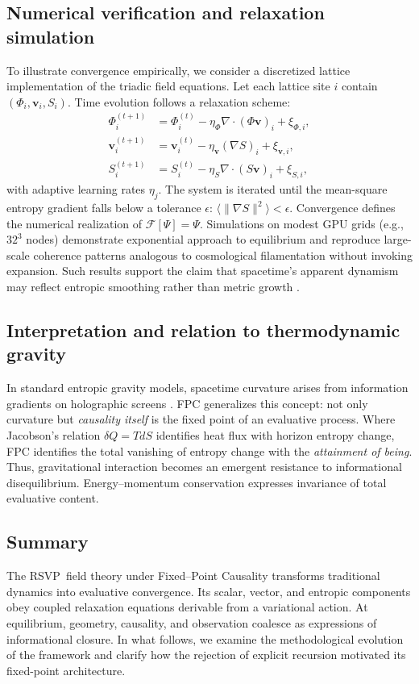 \documentclass[12pt,a4paper]{article}
\newcommand{\Ph}{\Phi}                %
\newcommand{\Vv}{\mathbf{v}}          %
\newcommand{\Ss}{S}                   %
\newcommand{\RSVP}{RSVP}              %
\newcommand{\divv}{\nabla\!\cdot\!}   %
\newcommand{\grad}{\nabla}            %
\newcommand{\State}{\Psi}             %
\newcommand{\F}{\mathcal{F}}          %
\theoremstyle{plain}
\begin{document}
\subsection{Numerical verification and relaxation simulation}
To illustrate convergence empirically, we consider a discretized lattice implementation of the triadic field equations.
Let each lattice site \(i\) contain \((\Ph_i,\Vv_i,\Ss_i)\).
Time evolution follows a relaxation scheme:
\begin{align}
\Ph_i^{(t+1)} &= \Ph_i^{(t)} - \eta_\Ph \divv(\Ph \Vv)_i + \xi_{\Ph,i}, \\
\Vv_i^{(t+1)} &= \Vv_i^{(t)} - \eta_\Vv(\grad \Ss)_i + \xi_{\Vv,i},\\
\Ss_i^{(t+1)} &= \Ss_i^{(t)} - \eta_\Ss \divv(\Ss \Vv)_i + \xi_{\Ss,i},
\end{align}
with adaptive learning rates \(\eta_j\).
The system is iterated until the mean-square entropy gradient falls below a tolerance \(\epsilon\):
\(\langle \|\grad \Ss\|^2 \rangle < \epsilon\).
Convergence defines the numerical realization of \(\F[\State]=\State\).
Simulations on modest GPU grids (e.g., \(32^3\) nodes) demonstrate exponential approach to equilibrium and reproduce large-scale coherence patterns analogous to cosmological filamentation without invoking expansion.
Such results support the claim that spacetime’s apparent dynamism may reflect entropic smoothing rather than metric growth \citep{perez2024nonexpanding}.

\subsection{Interpretation and relation to thermodynamic gravity}
In standard entropic gravity models, spacetime curvature arises from information gradients on holographic screens \citep{verlinde2011origin}.
FPC generalizes this concept: not only curvature but \emph{causality itself} is the fixed point of an evaluative process.
Where Jacobson’s relation \( \delta Q = T dS \) identifies heat flux with horizon entropy change, FPC identifies the total vanishing of entropy change with the \emph{attainment of being}.
Thus, gravitational interaction becomes an emergent resistance to informational disequilibrium.
Energy–momentum conservation expresses invariance of total evaluative content.

\subsection{Summary}
The \RSVP\ field theory under Fixed–Point Causality transforms traditional dynamics into evaluative convergence.
Its scalar, vector, and entropic components obey coupled relaxation equations derivable from a variational action.
At equilibrium, geometry, causality, and observation coalesce as expressions of informational closure.
In what follows, we examine the methodological evolution of the framework and clarify how the rejection of explicit recursion motivated its fixed-point architecture.
\end{document}
